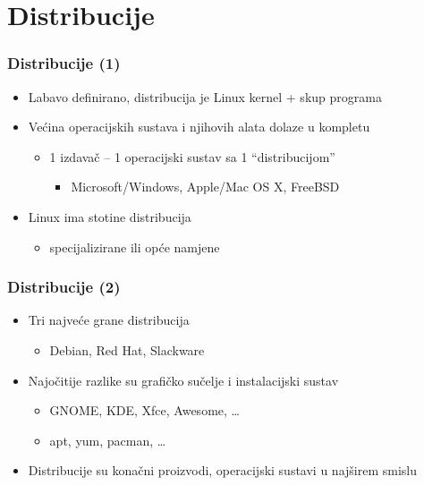\documentclass{beamer}
\begin{document}
\section{Distribucije}
\begin{frame}[t]
\frametitle{Distribucije (1)}
\begin{itemize}
  \item Labavo definirano, distribucija je Linux kernel + skup programa
  \item Većina operacijskih sustava i njihovih alata dolaze u kompletu
  \begin{itemize}
    \item 1 izdavač -- 1 operacijski sustav sa 1 ``distribucijom''
    \begin{itemize}
      \item Microsoft/Windows, Apple/Mac OS X, FreeBSD
    \end{itemize}
  \end{itemize}
  \item Linux ima stotine distribucija
  \begin{itemize}
    \item specijalizirane ili opće namjene
  \end{itemize}
\end{itemize}
\end{frame}

\begin{frame}[t]
\frametitle{Distribucije (2)}
\begin{itemize}
  \item Tri najveće grane distribucija
  \begin{itemize}
    \item Debian, Red Hat, Slackware
  \end{itemize}
  \item Najočitije razlike su grafičko sučelje i instalacijski sustav
  \begin{itemize}
    \item GNOME, KDE, Xfce, Awesome, \ldots
    \item apt, yum, pacman, \ldots
  \end{itemize}
  \item Distribucije su konačni proizvodi, operacijski sustavi u
        najširem smislu
\end{itemize}
\end{frame}
\end{document}
